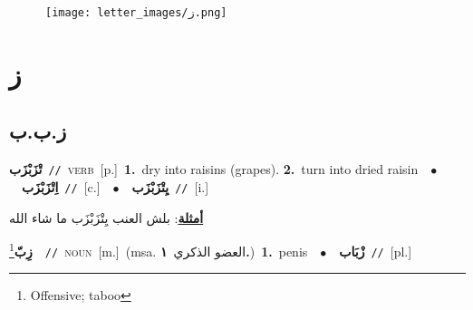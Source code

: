 \documentclass[10pt,a4paper,twoside]{article} %
\begin{document}
\begin{figure*}[t!]\centering\texttt{[image: letter\_images/ز.png]}\end{figure*}
\color{white}

 \section*{\foreignlanguage{arabic}{ز}} 
 \begin{multicols}{2} 

%
\color{black}
\vspace{-3mm}
\subsection*{\color{blue}\foreignlanguage{arabic}{ز.ب.ب}\color{blue}{}} 

{\setlength\topsep{0pt}\textbf{\foreignlanguage{arabic}{تْزَبْزَب}}\ {\color{gray}\texttt{//}\color{black}}\ \textsc{verb}\ [p.]\ \textbf{1.}~dry into raisins (grapes).  \textbf{2.}~turn into dried raisin\ \ $\bullet$\ \ \setlength\topsep{0pt}\textbf{\foreignlanguage{arabic}{اِتْزَبْزَب}}\ {\color{gray}\texttt{//}\color{black}}\ [c.]\ \ $\bullet$\ \ \setlength\topsep{0pt}\textbf{\foreignlanguage{arabic}{يِتْزَبْزَب}}\ {\color{gray}\texttt{//}\color{black}}\ [i.]\  \begin{flushright}\color{gray}\foreignlanguage{arabic}{\textbf{\underline{\foreignlanguage{arabic}{أمثلة}}}: بلش العنب يِتْزَبْزَب ما شاء الله}\end{flushright}\color{black}} \vspace{2mm}

{\setlength\topsep{0pt}\textbf{\foreignlanguage{arabic}{زِبّ}}\footnote{Offensive; taboo}\ \ {\color{gray}\texttt{//}\color{black}}\ \textsc{noun}\ [m.]\ \color{gray}(msa. \foreignlanguage{arabic}{العضو الذكري}~\foreignlanguage{arabic}{\textbf{١.}})\color{black}\ \textbf{1.}~penis\ \ $\bullet$\ \ \setlength\topsep{0pt}\textbf{\foreignlanguage{arabic}{زْبَاب}}\ {\color{gray}\texttt{//}\color{black}}\ [pl.]\ } \vspace{2mm}


\end{multicols}
\end{document}
